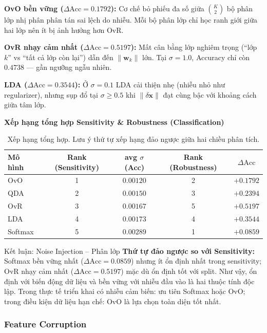 \textbf{OvO bền vững ($\Delta\text{Acc} = 0.1792$):}
Cơ chế bỏ phiếu đa số giữa $\binom{K}{2}$ bộ phân lớp nhị phân phân tán sai lệch do nhiễu.
Mỗi bộ phân lớp chỉ học ranh giới giữa hai lớp nên ít bị ảnh hưởng hơn OvR.

\textbf{OvR nhạy cảm nhất ($\Delta\text{Acc} = 0.5197$):}
Mất cân bằng lớp nghiêm trọng (``lớp $k$'' vs ``tất cả lớp còn lại'') dẫn đến $\|\mathbf{w}_k\|$ lớn.
Tại $\sigma = 1.0$, Accuracy chỉ còn $0.4738$ --- gần ngưỡng ngẫu nhiên.

\textbf{LDA ($\Delta\text{Acc} = 0.3544$):}
Ở $\sigma = 0.1$ LDA cải thiện nhẹ (nhiễu nhỏ như regularizer), nhưng sụp đổ tại $\sigma \geq 0.5$
khi $\|\delta\mathbf{x}\|$ đạt cùng bậc với khoảng cách giữa tâm lớp.

\textbf{Xếp hạng tổng hợp Sensitivity \& Robustness (Classification)}

\begin{table}[h]
\centering
\caption{Xếp hạng tổng hợp. Lưu ý thứ tự xếp hạng đảo ngược giữa hai chiều phân tích.}
\label{tab:cls_rank_summary}
\begin{tabular}{lcccc}
\toprule
\textbf{Mô hình} & \textbf{Rank (Sensitivity)} & \textbf{avg $\sigma$(Acc)} & \textbf{Rank (Robustness)} & $\Delta\text{Acc}$ \\
\midrule
OvO     & 1 & $0.00120$ & 2 & $+0.1792$ \\
QDA     & 2 & $0.00150$ & 3 & $+0.2394$ \\
OvR     & 3 & $0.00167$ & 5 & $+0.5197$ \\
LDA     & 4 & $0.00173$ & 4 & $+0.3544$ \\
Softmax & 5 & $0.00289$ & 1 & $+0.0859$ \\
\bottomrule
\end{tabular}
\end{table}

\begin{importantbox}{Kết luận: Noise Injection -- Phân lớp}
\textbf{Thứ tự đảo ngược so với Sensitivity:} Softmax bền vững nhất ($\Delta\text{Acc} = 0.0859$)
nhưng ít ổn định nhất trong sensitivity; OvR nhạy cảm nhất ($\Delta\text{Acc} = 0.5197$)
mặc dù ổn định tốt với split.
Như vậy, ổn định với biến động dữ liệu và bền vững với nhiễu đầu vào là hai
thuộc tính độc lập.
Trong thực tế triển khai có nhiễu cảm biến: ưu tiên Softmax hoặc OvO;
trong điều kiện dữ liệu hạn chế: OvO là lựa chọn toàn diện tốt nhất.
\end{importantbox}

\subsubsection{Feature Corruption}

